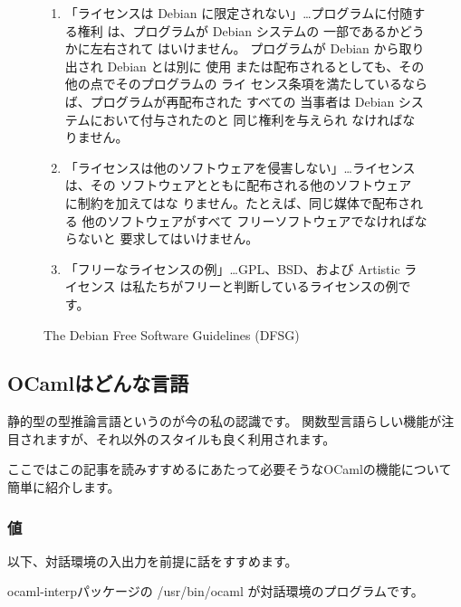 \documentclass[mingoth,a4paper]{jsarticle}
\begin{document}
\begin{figure}[h]
{\begin{enumerate}
       配布された すべての人々に対して、追加ライセンスの履行を必要とする
       ことなく、 適用されなければなりません。
 \item 「ライセンスは Debian に限定されない」…プログラムに付随する権利
       は、プログラムが Debian システムの 一部であるかどうかに左右されて
       はいけません。 プログラムが Debian から取り出され Debian とは別に
       使用 または配布されるとしても、その他の点でそのプログラムの ライ
       センス条項を満たしているならば、プログラムが再配布された すべての
       当事者は Debian システムにおいて付与されたのと 同じ権利を与えられ
       なければなりません。
 \item 「ライセンスは他のソフトウェアを侵害しない」…ライセンスは、その
       ソフトウェアとともに配布される他のソフトウェア に制約を加えてはな
       りません。たとえば、同じ媒体で配布される 他のソフトウェアがすべて
       フリーソフトウェアでなければならないと 要求してはいけません。
 \item 「フリーなライセンスの例」…GPL、BSD、および Artistic ライセンス
       は私たちがフリーと判断しているライセンスの例です。
\end{enumerate}
}
\caption{The Debian Free Software Guidelines (DFSG)}
\label{fig:dfsg}
\end{figure}


\subsection{OCamlはどんな言語}

静的型の型推論言語というのが今の私の認識です。
関数型言語らしい機能が注目されますが、それ以外のスタイルも良く利用されます。

ここではこの記事を読みすすめるにあたって必要そうなOCamlの機能について簡単に紹介します。

\subsubsection{値}

以下、対話環境の入出力を前提に話をすすめます。

ocaml-interpパッケージの /usr/bin/ocaml が対話環境のプログラムです。
\end{document}
